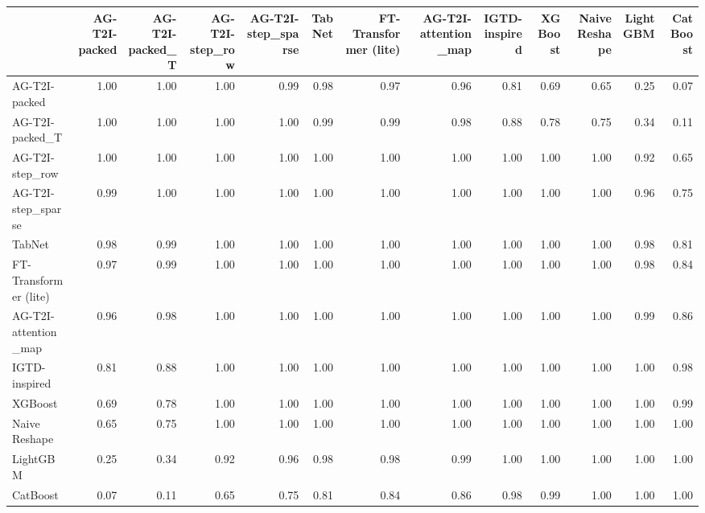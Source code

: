 \begin{tabular}{lrrrrrrrrrrrr}
\toprule
 & AG-T2I-packed & AG-T2I-packed_T & AG-T2I-step_row & AG-T2I-step_sparse & TabNet & FT-Transformer (lite) & AG-T2I-attention_map & IGTD-inspired & XGBoost & Naive Reshape & LightGBM & CatBoost \\
\midrule
AG-T2I-packed & 1.00 & 1.00 & 1.00 & 0.99 & 0.98 & 0.97 & 0.96 & 0.81 & 0.69 & 0.65 & 0.25 & 0.07 \\
AG-T2I-packed_T & 1.00 & 1.00 & 1.00 & 1.00 & 0.99 & 0.99 & 0.98 & 0.88 & 0.78 & 0.75 & 0.34 & 0.11 \\
AG-T2I-step_row & 1.00 & 1.00 & 1.00 & 1.00 & 1.00 & 1.00 & 1.00 & 1.00 & 1.00 & 1.00 & 0.92 & 0.65 \\
AG-T2I-step_sparse & 0.99 & 1.00 & 1.00 & 1.00 & 1.00 & 1.00 & 1.00 & 1.00 & 1.00 & 1.00 & 0.96 & 0.75 \\
TabNet & 0.98 & 0.99 & 1.00 & 1.00 & 1.00 & 1.00 & 1.00 & 1.00 & 1.00 & 1.00 & 0.98 & 0.81 \\
FT-Transformer (lite) & 0.97 & 0.99 & 1.00 & 1.00 & 1.00 & 1.00 & 1.00 & 1.00 & 1.00 & 1.00 & 0.98 & 0.84 \\
AG-T2I-attention_map & 0.96 & 0.98 & 1.00 & 1.00 & 1.00 & 1.00 & 1.00 & 1.00 & 1.00 & 1.00 & 0.99 & 0.86 \\
IGTD-inspired & 0.81 & 0.88 & 1.00 & 1.00 & 1.00 & 1.00 & 1.00 & 1.00 & 1.00 & 1.00 & 1.00 & 0.98 \\
XGBoost & 0.69 & 0.78 & 1.00 & 1.00 & 1.00 & 1.00 & 1.00 & 1.00 & 1.00 & 1.00 & 1.00 & 0.99 \\
Naive Reshape & 0.65 & 0.75 & 1.00 & 1.00 & 1.00 & 1.00 & 1.00 & 1.00 & 1.00 & 1.00 & 1.00 & 1.00 \\
LightGBM & 0.25 & 0.34 & 0.92 & 0.96 & 0.98 & 0.98 & 0.99 & 1.00 & 1.00 & 1.00 & 1.00 & 1.00 \\
CatBoost & 0.07 & 0.11 & 0.65 & 0.75 & 0.81 & 0.84 & 0.86 & 0.98 & 0.99 & 1.00 & 1.00 & 1.00 \\
\bottomrule
\end{tabular}

